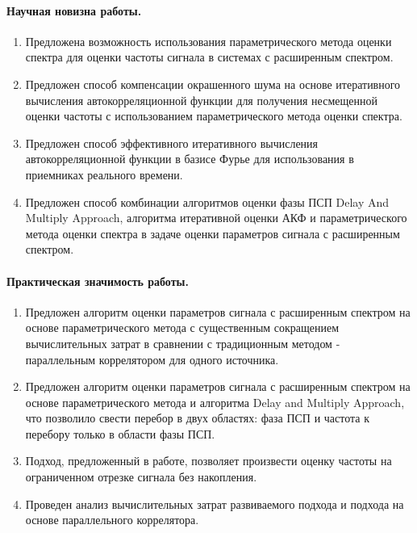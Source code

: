 \paragraph{Научная новизна работы.}
\begin{enumerate}
	\item{Предложена возможность использования параметрического метода оценки спектра для оценки частоты сигнала в системах с расширенным спектром.}
	\item{Предложен способ компенсации окрашенного шума на основе итеративного вычисления автокорреляционной функции для
		получения несмещенной оценки частоты с использованием параметрического метода оценки спектра.}
	\item{Предложен способ эффективного итеративного вычисления автокорреляционной функции в базисе Фурье для использования в
		приемниках реального времени.}
	\item{Предложен способ комбинации алгоритмов оценки фазы ПСП Delay And Multiply Approach, алгоритма итеративной оценки АКФ и
		параметрического метода оценки спектра в задаче оценки параметров сигнала с расширенным спектром.}
\end{enumerate}

\paragraph{Практическая значимость работы.}
\begin{enumerate}
	\item {Предложен алгоритм оценки параметров сигнала с расширенным спектром на основе параметрического метода с существенным
		сокращением вычислительных затрат в сравнении с традиционным методом - параллельным коррелятором для одного источника.}
	\item {Предложен алгоритм оценки параметров сигнала с расширенным спектром на основе параметрического метода и алгоритма
		Delay and Multiply Approach,
		что позволило свести перебор в двух областях: фаза ПСП и частота к перебору только в области фазы ПСП.}
	\item {Подход, предложенный в работе, позволяет произвести оценку частоты на ограниченном отрезке сигнала без накопления.}
	\item {Проведен анализ вычислительных затрат развиваемого подхода и подхода на основе параллельного коррелятора.}
\end{enumerate}

